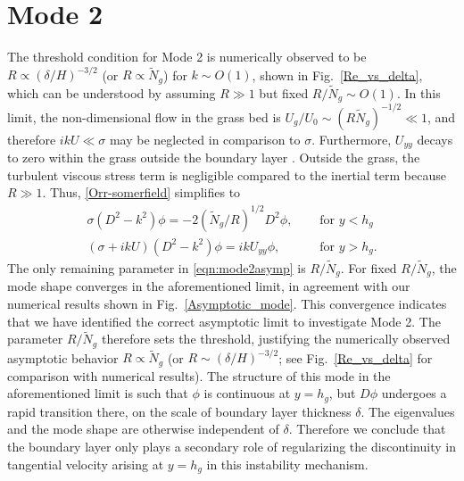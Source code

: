 \documentclass[12pt]{report}   %
\newcommand{\hg}{h_g}
\newcommand{\Rey}{{R}}
\newcommand{\Ndg}{\tilde{N}_g}
\begin{document}
\section{Mode 2}
The threshold condition for Mode 2 is numerically observed to be $\Rey \propto ({\delta}/{H})^{-3/2}$ (or $\Rey \propto \Ndg$) for $k\sim O(1)$, shown in Fig.~\ref{Re_vs_delta}, which can be understood by assuming $\Rey \gg 1$ but fixed $\Rey/\Ndg \sim O(1)$.
In this limit, the non-dimensional flow in the grass bed is $U_g/U_0 \sim (\Rey \Ndg)^{-1/2} \ll 1$, and therefore $ikU \ll \sigma$ may be neglected in comparison to $\sigma$. 
Furthermore, $U_{yy}$ decays to zero within the grass outside the boundary layer . 
Outside the grass, the turbulent viscous stress term is negligible compared to the inertial term because $\Rey \gg 1$. 
Thus, \eqref{Orr-somerfield} simplifies to 
\begin{subequations}
\begin{align}
\sigma\left(D^2-k^2\right)\phi = -2{(\Ndg/\Rey)^{1/2}}D^2\phi,  \quad &\text{ for } y<\hg  \label{eqn:mode2asympa} \\
\left(\sigma+ikU\right) \left(D^2-k^2\right)\phi =  ikU_{yy}\phi, \quad &\text{ for } y>\hg. \label{eqn:mode2asympb}
\end{align}
\label{eqn:mode2asymp}
\end{subequations}
The only remaining parameter in \eqref{eqn:mode2asymp} is $\Rey/\Ndg$. 
For fixed $\Rey/\Ndg$, the mode shape converges in the aforementioned limit, in agreement with our numerical results shown in Fig.~\ref{Asymptotic_mode}.
This convergence indicates that we have identified the correct asymptotic limit to investigate Mode 2.
The parameter $\Rey/\Ndg$ therefore sets the threshold, justifying the numerically observed asymptotic behavior $\Rey \propto \Ndg$ (or $\Rey \sim ({\delta}/{H})^{-3/2}$; see Fig.~\ref{Re_vs_delta} for comparison with numerical results).
The structure of this mode in the aforementioned limit is such that $\phi$ is continuous at $y=h_g$, but $D\phi$ undergoes a rapid transition there, on the scale of boundary layer thickness $\delta$.
The eigenvalues and the mode shape are otherwise independent of $\delta$.
Therefore we conclude that the boundary layer only plays a secondary role of regularizing the discontinuity in tangential velocity arising at $y=\hg$ in this instability mechanism.
\end{document}
